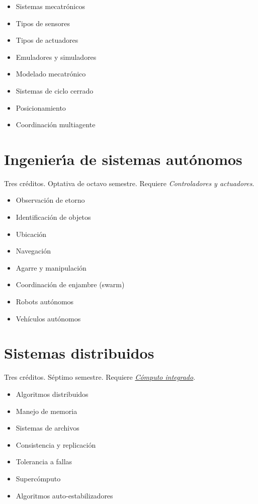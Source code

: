 \documentclass{article}
\begin{document}
\begin{multicols}{4}
\begin{itemize}
\item{Sistemas mecatr\'{o}nicos}
\item{Tipos de sensores}
\item{Tipos de actuadores}
\item{Emuladores y simuladores}  
\item{Modelado mecatr\'{o}nico}
\item{Sistemas de ciclo cerrado}
\item{Posicionamiento}
\item{Coordinaci\'{o}n multiagente}
\end{itemize}

\vfill\null \columnbreak

\hypertarget{idsa}{\section*{Ingenier\'{\i}a de sistemas
    aut\'{o}nomos}} Tres cr\'{e}ditos. Optativa de octavo
semestre. Requiere {\em Controladores y actuadores}.

\begin{itemize}
\item{Observaci\'{o}n de etorno}
\item{Identificaci\'{o}n de objetos}
\item{Ubicaci\'{o}n}
\item{Navegaci\'{o}n}
\item{Agarre y manipulaci\'{o}n}
\item{Coordinaci\'{o}n de enjambre (swarm)}
\item{Robots aut\'{o}nomos}
\item{Veh\'{i}culos aut\'{o}nomos}
\end{itemize}

\newpage

\hypertarget{sdi}{\section*{Sistemas distribuidos}} 

Tres cr\'{e}ditos. S\'{e}ptimo semestre. Requiere \hyperlink{ci}{\em
  C\'{o}mputo integrado}.

\begin{itemize}
\item{Algoritmos distribuidos}
\item{Manejo de memoria}
\item{Sistemas de archivos}
\item{Consistencia y replicaci\'{o}n}
\item{Tolerancia a fallas}
\item{Superc\'{o}mputo}
\item{Algoritmos auto-estabilizadores}
\end{itemize}


\end{multicols}
\end{document}
